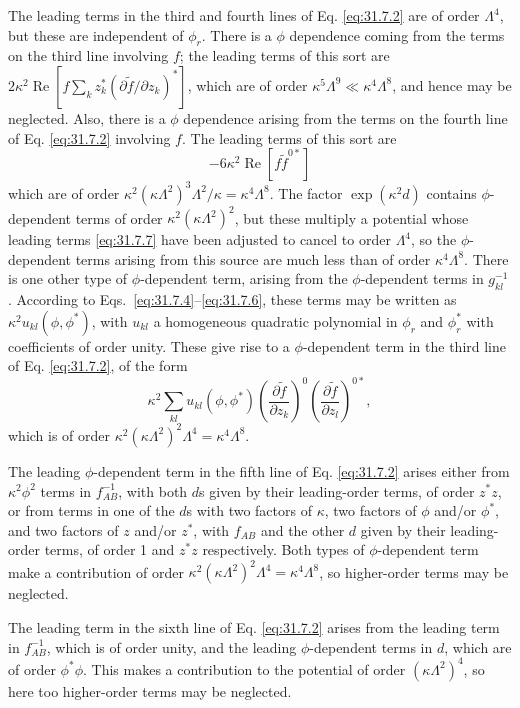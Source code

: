 The leading terms in the third and fourth lines of Eq. \eqref{eq:31.7.2}
are of order \(\Lambda^4\), but these are independent of \(\phi_r\). There
is a \(\phi\) dependence coming from the terms on the third line involving
\(f\); the leading terms of this sort are
\(2\kappa^2\operatorname{Re}
[f\sum_k z_k^*(\partial\widetilde f/\partial z_k)^*]\), which are of
order \(\kappa^5\Lambda^9\ll\kappa^4\Lambda^8\), and hence may be
neglected. Also, there is a \(\phi\) dependence arising from the terms on
the fourth line of Eq. \eqref{eq:31.7.2} involving \(f\). The leading terms
of this sort are
\[
  -6\kappa^2\operatorname{Re}[f\widetilde f^{0*}]
\]
which are of order
\(\kappa^2(\kappa\Lambda^2)^3\Lambda^2/\kappa
=\kappa^4\Lambda^8\). The factor \(\exp(\kappa^2d)\) contains
\(\phi\)-dependent terms of order \(\kappa^2(\kappa\Lambda^2)^2\), but
these multiply a potential whose leading terms \eqref{eq:31.7.7} have been
adjusted to cancel to order \(\Lambda^4\), so the \(\phi\)-dependent terms
arising from this source are much less than of order
\(\kappa^4\Lambda^8\). There is one other type of \(\phi\)-dependent term,
arising from the \(\phi\)-dependent terms in \(g_{kl}^{-1}\). According to
Eqs.~\eqref{eq:31.7.4}--\eqref{eq:31.7.6}, these terms may be written as
\(\kappa^2u_{kl}(\phi,\phi^*)\), with \(u_{kl}\) a homogeneous quadratic
polynomial in \(\phi_r\) and \(\phi_r^*\) with coefficients of order unity.
These give rise to a \(\phi\)-dependent term in the third line of
Eq. \eqref{eq:31.7.2}, of the form
\[
  \kappa^2\sum_{kl}u_{kl}(\phi,\phi^*)
  \left(\frac{\partial\widetilde f}{\partial z_k}\right)^0
  \left(\frac{\partial\widetilde f}{\partial z_l}\right)^{0*},
\]
which is of order
\(\kappa^2(\kappa\Lambda^2)^2\Lambda^4=\kappa^4\Lambda^8\).

The leading \(\phi\)-dependent term in the fifth line of
Eq. \eqref{eq:31.7.2} arises either from \(\kappa^2\phi^2\) terms in
\(f_{AB}^{-1}\), with both \(d\)s given by their leading-order terms, of
order \(z^*z\), or from terms in one of the \(d\)s with two factors of
\(\kappa\), two factors of \(\phi\) and/or \(\phi^*\), and two factors of
\(z\) and/or \(z^*\), with \(f_{AB}\) and the other \(d\) given by their
leading-order terms, of order 1 and \(z^*z\) respectively. Both types of
\(\phi\)-dependent term make a contribution of order
\(\kappa^2(\kappa\Lambda^2)^2\Lambda^4=\kappa^4\Lambda^8\), so
higher-order terms may be neglected.

The leading term in the sixth line of Eq. \eqref{eq:31.7.2} arises from the
leading term in \(f_{AB}^{-1}\), which is of order unity, and the leading
\(\phi\)-dependent terms in \(d\), which are of order \(\phi^*\phi\). This
makes a contribution to the potential of order
\((\kappa\Lambda^2)^4\), so here too higher-order terms may be neglected.


